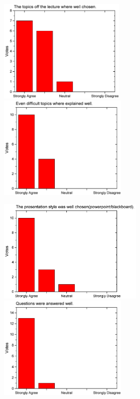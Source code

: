 \begin{figure}[H]
  \begin{minipage}{.48\linewidth}
    \centering
      {\includegraphics[height=50mm]{figures/n/Graph77.pdf}}
      {\includegraphics[height=50mm]{figures/n/Graph78.pdf}}
  \end{minipage}\quad
  \begin{minipage}{.48\linewidth}
    \centering
      {\includegraphics[height=50mm]{figures/n/Graph79.pdf}}
      {\includegraphics[height=50mm]{figures/n/Graph80.pdf}}
  \end{minipage}
\end{figure}

